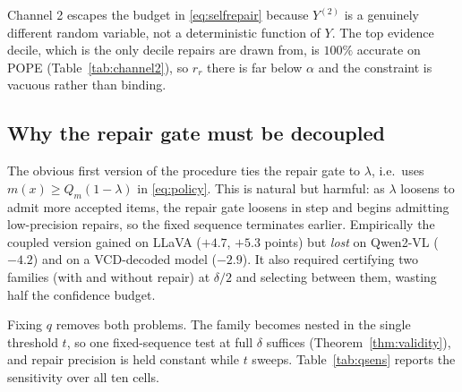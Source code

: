 \documentclass[review,number,doubleblind]{elsarticle}
\theoremstyle{plain}
\theoremstyle{definition}
\theoremstyle{remark}
\begin{document}
Channel 2 escapes the budget in \eqref{eq:selfrepair} because $Y^{(2)}$ is a genuinely
different random variable, not a deterministic function of $Y$. The top evidence decile, which
is the only decile repairs are drawn from, is $100\%$ accurate on POPE
(Table~\ref{tab:channel2}), so $r_r$ there is far below $\alpha$ and the constraint is vacuous
rather than binding.

\begin{table}[t]
\centering
\caption{Channel-2 (detector) accuracy by evidence-margin decile on POPE-1500 ($150$ items per
decile). Repairs are drawn only from the top decile, where accuracy is $100\%$, far above
$1-\alpha$. Accuracy improves with the margin but not monotonically --- the 5th falls below the
4th and the 8th below the 7th --- which is why the repair gate must be strict rather than merely
above the median. All ten deciles are printed because the non-monotonicity is the point.}
\label{tab:channel2}
\small
{}
\end{table}

\subsection{Why the repair gate must be decoupled}
\label{sec:decoupling}

The obvious first version of the procedure ties the repair gate to $\lambda$, i.e.\ uses
$m(x)\ge Q_m(1-\lambda)$ in \eqref{eq:policy}. This is natural but harmful: as $\lambda$
loosens to admit more accepted items, the repair gate loosens in step and begins admitting
low-precision repairs, so the fixed sequence terminates earlier. Empirically the coupled
version gained on LLaVA ($+4.7$, $+5.3$ points) but \emph{lost} on Qwen2-VL ($-4.2$) and on
a VCD-decoded model ($-2.9$). It also required certifying two families (with and without
repair) at $\delta/2$ and selecting between them, wasting half the confidence budget.

Fixing $q$ removes both problems. The family becomes nested in the single threshold
$t$, so one fixed-sequence test at full $\delta$ suffices (Theorem~\ref{thm:validity}), and
repair precision is held constant while $t$ sweeps. Table~\ref{tab:qsens} reports the
sensitivity over all ten cells.
\end{document}
